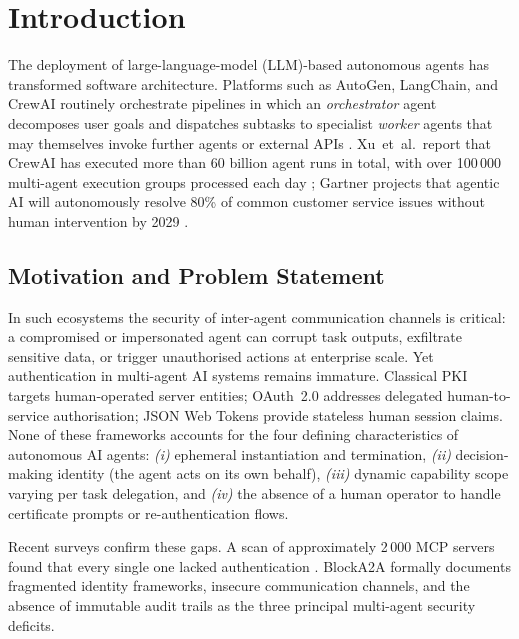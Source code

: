 \documentclass[review,5p,twocolumn,times]{elsarticle}
\begin{document}
\section{Introduction}\label{sec:intro}

The deployment of large-language-model (LLM)-based autonomous agents has
transformed software architecture. Platforms such as AutoGen, LangChain, and
CrewAI routinely orchestrate pipelines in which an \emph{orchestrator} agent
decomposes user goals and dispatches subtasks to specialist \emph{worker}
agents that may themselves invoke further agents or external APIs
\cite{wang2023survey}. Xu~et~al.\ report that CrewAI has executed more than
60 billion agent runs in total, with over 100\,000 multi-agent execution
groups processed each day \cite{agentdid2026}; Gartner projects that agentic
AI will autonomously resolve 80\% of common customer service issues without
human intervention by 2029 \cite{gartner2025agentic}.

\subsection{Motivation and Problem Statement}

In such ecosystems the security of inter-agent communication channels is
critical: a compromised or impersonated agent can corrupt task outputs,
exfiltrate sensitive data, or trigger unauthorised actions at enterprise
scale. Yet authentication in multi-agent AI systems remains immature.
Classical PKI \cite{rfc5280} targets human-operated server entities;
OAuth~2.0 \cite{rfc6749} addresses delegated human-to-service authorisation;
JSON Web Tokens \cite{rfc7519} provide stateless human session claims.
None of these frameworks accounts for the four defining characteristics of
autonomous AI agents: \emph{(i)} ephemeral instantiation and termination,
\emph{(ii)} decision-making identity (the agent acts on its own behalf),
\emph{(iii)} dynamic capability scope varying per task delegation, and
\emph{(iv)} the absence of a human operator to handle certificate prompts
or re-authentication flows.

Recent surveys confirm these gaps. A scan of approximately 2\,000 MCP
servers found that every single one lacked authentication \cite{aip2026}.
BlockA2A \cite{blocka2a2025} formally documents fragmented identity
frameworks, insecure communication channels, and the absence of immutable
audit trails as the three principal multi-agent security deficits.
\end{document}

